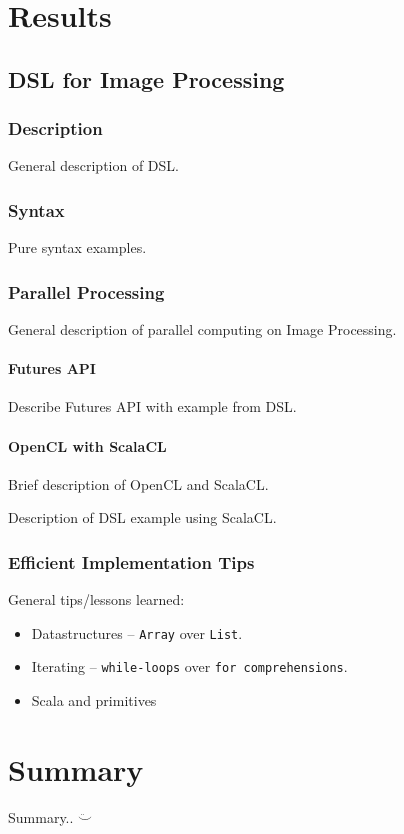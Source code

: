 \documentclass[a4paper,english]{report}
\begin{document}
\chapter{Results}

\section{DSL for Image Processing}

\subsection{Description}

General description of DSL.

\subsection{Syntax}

Pure syntax examples.

\subsection{Parallel Processing}

General description of parallel computing on Image Processing.

\subsubsection{Futures API}

Describe Futures API with example from DSL.

\subsubsection{OpenCL with ScalaCL}

Brief description of OpenCL and ScalaCL.

Description of DSL example using ScalaCL.

\subsection{Efficient Implementation Tips}

General tips/lessons learned:

\begin{itemize}
  \item Datastructures -- \texttt{Array} over \texttt{List}.
  \item Iterating -- \texttt{while-loops} over \texttt{for comprehensions}.
  \item Scala and primitives
\end{itemize}

\chapter{Summary}

Summary.. $\ddot\smile$



\end{document}
